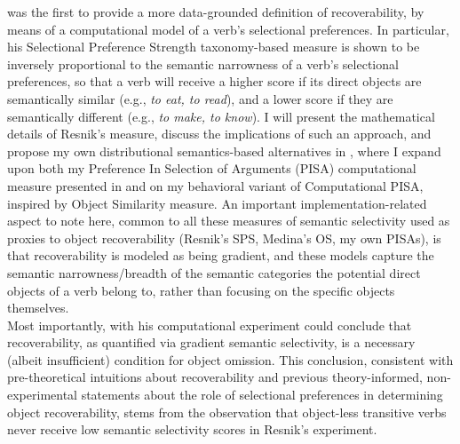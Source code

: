 \textcite{Resnik1993, Resnik1996} was the first to provide a more data-grounded definition of recoverability, by means of a computational model of a verb's selectional preferences. In particular, his Selectional Preference Strength taxonomy-based measure is shown to be inversely proportional to the semantic narrowness of a verb's selectional preferences, so that a verb will receive a higher score if its direct objects are semantically similar (e.g., \textit{to eat, to read}), and a lower score if they are semantically different (e.g., \textit{to make, to know}). I will present the mathematical details of Resnik's measure, discuss the implications of such an approach, and propose my own distributional semantics-based alternatives in , where I expand upon both my Preference In Selection of Arguments (PISA) computational measure presented in \textcite{CappelliLenciPISA} and on my behavioral variant of Computational PISA, inspired by  Object Similarity measure. An important implementation-related aspect to note here, common to all these measures of semantic selectivity used as proxies to object recoverability (Resnik's SPS, Medina's OS, my own PISAs), is that recoverability is modeled as being gradient, and these models capture the semantic narrowness/breadth of the semantic categories the potential direct objects of a verb belong to, rather than focusing on the specific objects themselves.\\
Most importantly, with his computational experiment \textcite[88]{Resnik1993} could conclude that recoverability, as quantified via gradient semantic selectivity, is a necessary (albeit insufficient) condition for object omission. This conclusion, consistent with pre-theoretical intuitions about recoverability and previous theory-informed, non-experimental statements about the role of selectional preferences in determining object recoverability, stems from the observation that object-less transitive verbs never receive low semantic selectivity scores in Resnik's experiment.


